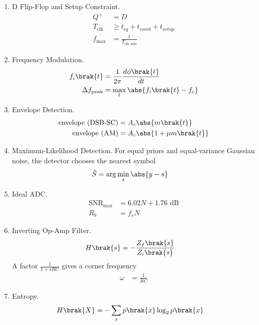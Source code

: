\begin{enumerate}[label=\thesubsection.\arabic*, ref=\thesubsection.\theenumi]
\begin{align}
X + \overline{Y} + 1 &= X + \brak{2^n - 1} - Y + 1
\\
&= X - Y + 2^n
\\
&\equiv X - Y \pmod{2^n}
\end{align}
\item D Flip-Flop and Setup Constraint.
\begin{align}
Q^{+} &= D
\label{eq:F-dff}
\\
T_{\mathrm{clk}} &\ge t_{cq} + t_{comb} + t_{setup}
\\
f_{\max} &= \frac{1}{T_{\mathrm{clk,min}}}
\label{eq:F-setup}
\end{align}
\item Frequency Modulation.
\begin{align}
f_i\brak{t} &= \frac{1}{2\pi} \frac{d\phi\brak{t}}{dt}
\\
\Delta f_{\mathrm{peak}} &= \max_{t} \abs{f_i\brak{t} - f_c}
\label{eq:F-fm}
\end{align}
\item Envelope Detection.
\begin{align}
\text{envelope (DSB-SC)} &= A_c \abs{m\brak{t}}
\\
\text{envelope (AM)} &= A_c \abs{1 + \mu m\brak{t}}
\label{eq:F-envelope}
\end{align}
\item Maximum-Likelihood Detection. For equal priors and equal-variance Gaussian noise, the detector chooses the nearest symbol
\begin{align}
\hat{S} &= \arg\min_{s} \abs{y - s}
\label{eq:F-ml}
\end{align}
\item Ideal ADC.
\begin{align}
\mathrm{SNR}_{\max} &= 6.02 N + 1.76 \text{ dB}
\\
R_b &= f_s N
\label{eq:F-adc}
\end{align}
\item Inverting Op-Amp Filter.
\begin{align}
H\brak{s} &= -\frac{Z_f\brak{s}}{Z_i\brak{s}}
\label{eq:F-inv}
\end{align}
A factor $\frac{1}{1 + sRC}$ gives a corner frequency
\begin{align}
\omega &= \frac{1}{RC}
\label{eq:F-corner}
\end{align}
\item Entropy.
\begin{align}
H\brak{X} &= -\sum_{x} p\brak{x} \log_2 p\brak{x}
\label{eq:F-entropy}
\end{align}

\end{enumerate}
